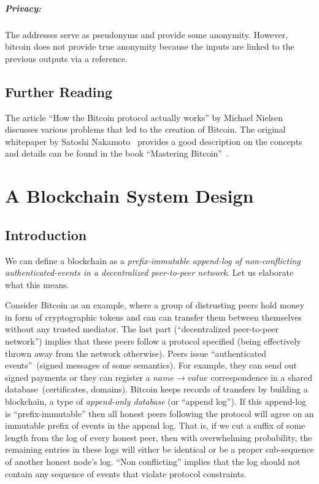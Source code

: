 \documentclass[]{report}   %
\begin{document}
\paragraph{Privacy:} The addresses serve as pseudonyms and provide some anonymity. However, bitcoin does not provide true anonymity because the inputs are linked to the previous outputs via a reference.

\section{Further Reading}

The article ``How the Bitcoin protocol actually works'' by Michael Nielsen~\cite{nielsen} discusses various problems that led to the creation of Bitcoin. The original whitepaper by Satoshi Nakamoto~\cite{Nakamoto2008} provides a good description on the concepts and details can be found in the book ``Mastering Bitcoin''~\cite{antonopoulos2014mastering}. 



\chapter{A Blockchain System Design}             %
\section{Introduction}     

We can define a blockchain as a {\em prefix-immutable append-log of non-conflicting authenticated-events in a decentralized peer-to-peer network}. Let us elaborate what this means.

Consider Bitcoin as an example, where a group of distrusting peers hold money in form of cryptographic tokens and can can transfer them between themselves without any trusted mediator. The last part (``decentralized peer-to-peer network'') implies that these peers follow a protocol specified (being effectively thrown away from the network otherwise). Peers issue ``authenticated events''~(signed messages of some semantics). For example, they can send out signed payments or they can register a \(name \rightarrow value\) correspondence in a shared database~(certificates, domains). Bitcoin keeps records of transfers by building a blockchain, a type of {\em append-only database} (or ``append log''). If this append-log is ``prefix-immutable'' then all honest peers following the protocol will agree on an immutable prefix of events in the append log. That is, if we cut a suffix of some length from the log of every honest peer, then with overwhelming probability, the remaining entries in these logs will either be identical or be a proper sub-sequence of another honest node's log. ``Non conflicting'' implies that the log should not contain any sequence of events that violate protocol constraints.
\end{document}
